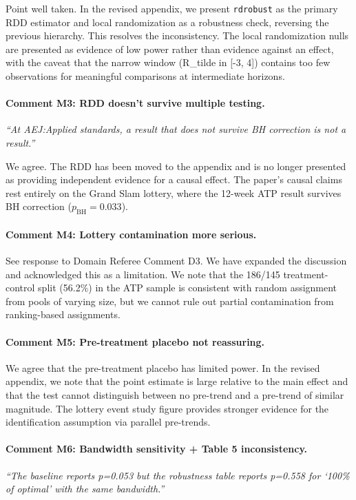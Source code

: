 \documentclass[12pt]{article}
\newcommand{\resp}[1]{\textcolor{response}{#1}}
\begin{document}
\resp{Point well taken. In the revised appendix, we present \texttt{rdrobust} as the primary RDD estimator and local randomization as a robustness check, reversing the previous hierarchy. This resolves the inconsistency. The local randomization nulls are presented as evidence of low power rather than evidence against an effect, with the caveat that the narrow window (R\_tilde in [-3, 4]) contains too few observations for meaningful comparisons at intermediate horizons.}

\paragraph{Comment M3: RDD doesn't survive multiple testing.}
\textit{``At AEJ:Applied standards, a result that does not survive BH correction is not a result.''}

\resp{We agree. The RDD has been moved to the appendix and is no longer presented as providing independent evidence for a causal effect. The paper's causal claims rest entirely on the Grand Slam lottery, where the 12-week ATP result survives BH correction ($p_{\text{BH}} = 0.033$).}

\paragraph{Comment M4: Lottery contamination more serious.}
\resp{See response to Domain Referee Comment D3. We have expanded the discussion and acknowledged this as a limitation. We note that the 186/145 treatment-control split (56.2\%) in the ATP sample is consistent with random assignment from pools of varying size, but we cannot rule out partial contamination from ranking-based assignments.}

\paragraph{Comment M5: Pre-treatment placebo not reassuring.}
\resp{We agree that the pre-treatment placebo has limited power. In the revised appendix, we note that the point estimate is large relative to the main effect and that the test cannot distinguish between no pre-trend and a pre-trend of similar magnitude. The lottery event study figure provides stronger evidence for the identification assumption via parallel pre-trends.}

\paragraph{Comment M6: Bandwidth sensitivity + Table 5 inconsistency.}
\textit{``The baseline reports p=0.053 but the robustness table reports p=0.558 for `100\% of optimal' with the same bandwidth.''}
\end{document}
